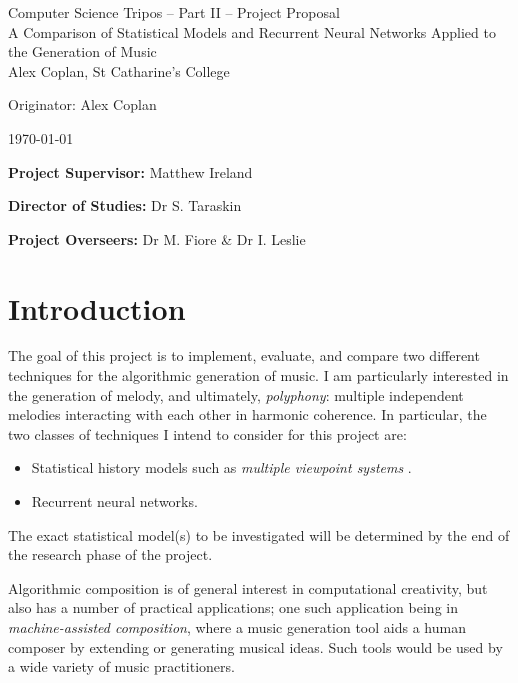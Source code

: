 \documentclass[12pt,a4paper,twoside]{article}
\begin{document}
\cleanlookdateon

\begin{center}
\Large
Computer Science Tripos -- Part II -- Project Proposal\\[4mm]
\LARGE
A Comparison of Statistical Models and Recurrent Neural Networks Applied to the
Generation of Music\\[4mm]

\large
Alex Coplan, St Catharine's College

Originator: Alex Coplan

\today
\end{center}

\vspace{5mm}

\textbf{Project Supervisor:} Matthew Ireland

\textbf{Director of Studies:} Dr S. Taraskin

\textbf{Project Overseers:} Dr M. Fiore \& Dr I. Leslie


\section*{Introduction}

The goal of this project is to implement, evaluate, and compare two different
techniques for the algorithmic generation of music. I am particularly interested
in the generation of melody, and ultimately, \emph{polyphony}: multiple
independent melodies interacting with each other in harmonic coherence. In
particular, the two classes of techniques I intend to consider for this project
are:
\begin{itemize}[itemsep=0mm]
	\item Statistical history models such as \emph{multiple viewpoint
			systems} \cite{conklin1995viewpoints}.
	\item Recurrent neural networks.
\end{itemize}

The exact statistical model(s) to be investigated will be determined by the end
of the research phase of the project.

Algorithmic composition is of general interest in computational creativity, but
also has a number of practical applications; one such application being in
\emph{machine-assisted composition}, where a music generation tool aids a human
composer by extending or generating musical ideas. Such tools would be used by a
wide variety of music practitioners.
\end{document}
